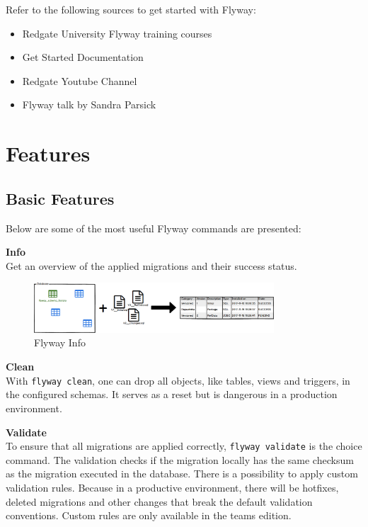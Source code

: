%
Refer to the following sources to get started with Flyway:
\begin{itemize}
	\item Redgate University Flyway training courses \cite{FlyCourse}
	\item Get Started Documentation \cite{FlywayGetStarted}
	\item Redgate Youtube Channel \cite{RedGateYT}
	\item Flyway talk by Sandra Parsick \cite{Parsick2018}
\end{itemize}

\section{Features \label{flyway_features}}


\subsection{Basic Features}
Below are some of the most useful Flyway commands are presented:


\textbf{Info}\\
Get an overview of the applied migrations and their success status.\\

\begin{figure}[H]
	\centering
	\includegraphics[width=0.8\textwidth]{./chapters/intro_flyway/images/command-info}
	\caption[Flyway Info - Source: \cite{FlywayGetStarted}]{Flyway Info}
	\label{fig:command-info}
\end{figure}

\textbf{Clean}\\
With \texttt{flyway clean}, one can drop all objects, like tables, views and triggers, in the configured schemas. It serves as a reset but is dangerous in a production environment.

\textbf{Validate}\\
To ensure that all migrations are applied correctly,  \texttt{flyway validate} is the choice command. The validation checks if the migration locally has the same checksum as the migration executed in the database.
There is a possibility to apply custom validation rules. Because in a productive environment, there will be hotfixes, deleted migrations and other changes that break the default validation conventions. Custom rules are only available in the teams edition.

